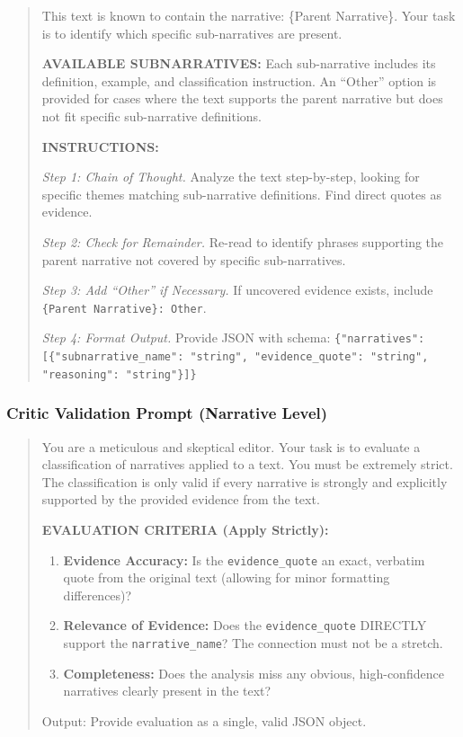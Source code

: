 \begin{small}
\begin{quote}
This text is known to contain the narrative: \{Parent Narrative\}. Your task is to identify which specific sub-narratives are present.

\textbf{AVAILABLE SUBNARRATIVES:} Each sub-narrative includes its definition, example, and classification instruction. An ``Other'' option is provided for cases where the text supports the parent narrative but does not fit specific sub-narrative definitions.

\textbf{INSTRUCTIONS:}

\textit{Step 1: Chain of Thought.} Analyze the text step-by-step, looking for specific themes matching sub-narrative definitions. Find direct quotes as evidence.

\textit{Step 2: Check for Remainder.} Re-read to identify phrases supporting the parent narrative not covered by specific sub-narratives.

\textit{Step 3: Add ``Other'' if Necessary.} If uncovered evidence exists, include \texttt{\{Parent Narrative\}: Other}.

\textit{Step 4: Format Output.} Provide JSON with schema: \texttt{\{"narratives": [\{"subnarrative\_name": "string", "evidence\_quote": "string", "reasoning": "string"\}]\}}
\end{quote}
\end{small}

\subsubsection{Critic Validation Prompt (Narrative Level)}

\begin{small}
\begin{quote}
You are a meticulous and skeptical editor. Your task is to evaluate a classification of narratives applied to a text. You must be extremely strict. The classification is only valid if every narrative is strongly and explicitly supported by the provided evidence from the text.

\textbf{EVALUATION CRITERIA (Apply Strictly):}
\begin{enumerate}
\item \textbf{Evidence Accuracy:} Is the \texttt{evidence\_quote} an exact, verbatim quote from the original text (allowing for minor formatting differences)?
\item \textbf{Relevance of Evidence:} Does the \texttt{evidence\_quote} DIRECTLY support the \texttt{narrative\_name}? The connection must not be a stretch.
\item \textbf{Completeness:} Does the analysis miss any obvious, high-confidence narratives clearly present in the text?
\end{enumerate}

Output: Provide evaluation as a single, valid JSON object.
\end{quote}
\end{small}

